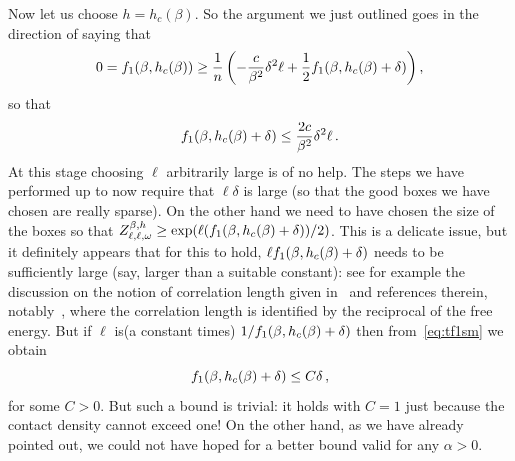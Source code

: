 \documentclass[11pt]{article}
\theoremstyle{definition}
\numberwithin{equation}{section}
\numberwithin{figure}{section}
\numberwithin{table}{section}
\newcommand{\gb}{\beta}
\newcommand{\gd}{\delta}
\newcommand{\go}{\omega}
\newcommand{\tf}{\textsc{f}} %
\begin{document}
Now let us choose $h=h_c(\gb)$. So the argument we just outlined goes in the direction of saying that
\begin{equation}
0 = \tf_1(\gb, h_c(\gb)) \ge \frac{1}{n} \left(-\frac{c}{\gb^2} \gd ^2 \ell+ \frac{1}{2} \tf_1(\gb, h_c(\gb)+ \gd) \right),
\end{equation}
so that
\begin{equation}
\tf_1(\gb, h_c(\gb)+ \gd)\le \frac{2c}{\gb^2} \gd ^2 \ell\,.\label{eq:tf1sm}
\end{equation}
At this stage choosing $\ell$ arbitrarily large is of no help. The steps we have performed up to now require that $ \ell \gd$ is large (so that the good boxes we have chosen are really sparse). On the other hand we need to have chosen the size of the boxes so that $Z_{\ell, \ell, \go}^{\gb, h} \ge \exp(\ell (\tf_1(\gb, h_c(\gb)+ \gd))/2)$. This is a delicate issue, but it definitely appears that for this to hold, $\ell \tf_1(\gb, h_c(\gb)+ \gd)$ needs to be sufficiently large (say, larger than a suitable constant): see for example the discussion on the notion of correlation length given in~\cite[Chapter~2]{cf:G} and references therein, notably~\cite{cf:GTalea}, where the correlation length is identified by the reciprocal of the free energy. But if $\ell$ is\linebreak(a constant times) $1/\tf_1(\gb, h_c(\gb)+ \gd)$ then from~\eqref{eq:tf1sm} we obtain
\begin{equation}\label{eq:trivb}
\tf_1(\gb, h_c(\gb)+ \gd)\le C \gd\,,
\end{equation}
for some $C>0$. But such a bound is trivial: it holds with $C=1$ just because the contact density cannot exceed one! On the other hand, as we have already pointed out, we could not have hoped for a better bound valid for any $\alpha>0$.
\end{document}
